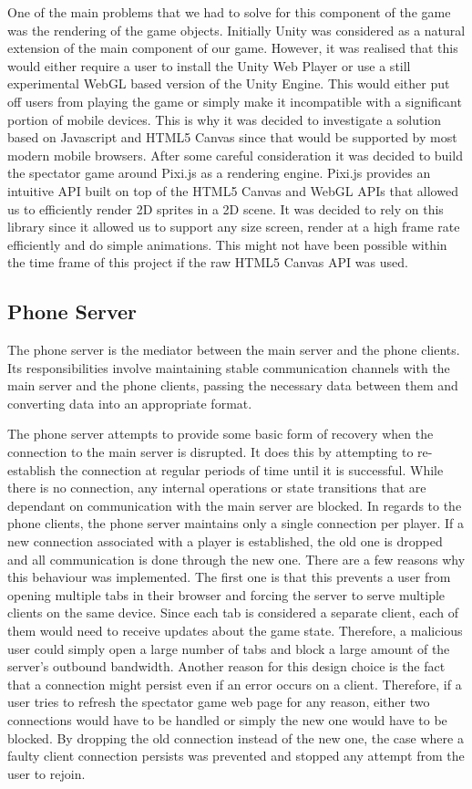 \documentclass[a4paper,11pt]{article}
\begin{document}
One of the main problems that we had to solve for this component of the game was the rendering of the game objects. Initially Unity was considered as a natural extension of the main component of our game. However, it was realised that this would either require a user to install the Unity Web Player or use a still experimental WebGL based version of the Unity Engine. This would either put off users from playing the game or simply make it incompatible with a significant portion of mobile devices. This is why it was decided to investigate a solution based on Javascript and HTML5 Canvas\cite{html5_canvas} since that would be supported by most modern mobile browsers. After some careful consideration it was decided to build the spectator game around Pixi.js\cite{pixi_js} as a rendering engine. Pixi.js provides an intuitive API built on top of the HTML5 Canvas and WebGL APIs that allowed us to efficiently render 2D sprites in a 2D scene. It was  decided to rely on this library since it allowed us to support any size screen, render at a high frame rate efficiently and do simple animations. This might not have been possible within the time frame of this project if the raw HTML5 Canvas API was used.

\subsection{Phone Server}
The phone server is the mediator between the main server and the phone clients. Its responsibilities involve maintaining stable communication channels with the main server and the phone clients, passing the necessary data between them and converting data into an appropriate format.

The phone server attempts to provide some basic form of recovery when the connection to the main server is disrupted. It does this by attempting to re-establish the connection at regular periods of time until it is successful. While there is no connection, any internal operations or state transitions that are dependant on communication with the main server are blocked. In regards to the phone clients, the phone server maintains only a single connection per player. If a new connection associated with a player is established, the old one is dropped and all communication is done through the new one. There are a few reasons why this behaviour was implemented. The first one is that this prevents a user from opening multiple tabs in their browser and forcing the server to serve multiple clients on the same device. Since each tab is considered a separate client, each of them would need to receive updates about the game state. Therefore, a malicious user could simply open a large number of tabs and block a large amount of the server's outbound bandwidth. Another reason for this design choice is the fact that a connection might persist even if an error occurs on a client. Therefore, if a user tries to refresh the spectator game web page for any reason, either two connections would have to be handled or simply the new one would have to be blocked. By dropping the old connection instead of the new one, the case where a faulty client connection persists was prevented and stopped any attempt from the user to rejoin.
\end{document}
